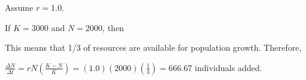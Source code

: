 \documentclass[t]{beamer}
\begin{document}
%
\begin{frame}
	\hangpara Assume $r = 1.0$.
	
	\hangpara If $K = 3000$ and $N = 2000$, \pause then
	
	
	\hangpara This means that 1/3 of resources are available for population growth. \pause Therefore,
	
	\hangpara $\frac{\Delta N}{\Delta t} = rN\left(\frac{K-N}{K}\right) = (1.0)(2000)(\frac{1}{3}) = 666.67$ individuals added.
\end{frame}
%
{
\begin{frame}
\end{frame}
}
%
\end{document}
